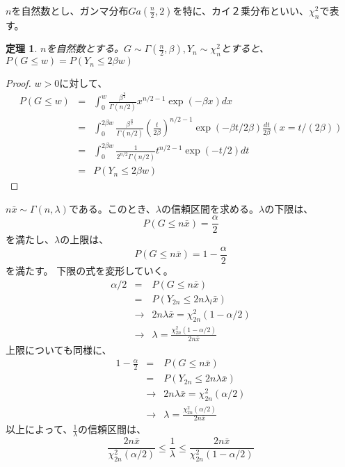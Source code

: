 \documentclass[a4paper,11pt,dvipdfmx]{jsarticle}
\newtheorem{theo}{定理}[section]
\begin{document}


$n$を自然数とし、ガンマ分布$Ga(\frac{n}{2},2)$を特に、カイ２乗分布といい、$\chi ^2_n$で表す。



\begin{theo}
$n$を自然数とする。$G\sim\Gamma(\frac{n}{2},\beta),Y_n\sim \chi^2_n$とすると、$P(G\leq w) = P(Y_n \leq 2\beta w)$
\end{theo}
\begin{proof}
$w >0$に対して、
\begin{eqnarray*}
    P(G \leq w) &=& \int_0^w \frac{\beta^\frac{n}{2}}{\Gamma(n/2)}x^{n/2-1}\exp{(-\beta x)}dx \\
    &=&\int_0^{2\beta w} \frac{\beta^{\frac{n}{2}}}{\Gamma(n/2)}\left( \frac{t}{2\beta} \right)^{n/2-1}\exp{(-\beta t/2\beta)}\frac{dt}{2\beta} (x=t/(2\beta)) \\
    &=& \int_0^{2\beta w} \frac{1}{2^{n/2}\Gamma(n/2)}t^{n/2-1}\exp{(-t/2)}dt\\
    &=&P(Y_n \leq 2\beta w)
\end{eqnarray*}
\end{proof}



$n\bar{x}\sim \Gamma(n,\lambda)$である。このとき、$\lambda$の信頼区間を求める。$\lambda$の下限は、
\begin{equation}
    P(G\leq n\bar{x}) = \frac{\alpha}{2}
\end{equation}
を満たし、$\lambda$の上限は、
\begin{equation}
P(G\leq n\bar{x}) = 1-\frac{\alpha}{2}
\end{equation}
を満たす。
下限の式を変形していく。
\begin{eqnarray*}
    \alpha/2 &=& P(G\leq n\bar{x})  \\
    &=& P(Y_{2n}\leq 2n \lambda_l \bar{x})\\
    &\rightarrow& 2n\lambda \bar{x} = \chi^2_{2n}(1-\alpha/2)\\
    &\rightarrow& \lambda = \frac{\chi^2_{2n}(1-\alpha/2)}{2n\bar{x}}
\end{eqnarray*}
上限についても同様に、
\begin{eqnarray*}
    1-\frac{\alpha}{2} &= & P(G\leq n\bar{x}) \\
    &=& P(Y_{2n}\leq 2n\lambda \bar{x})  \\
    &\rightarrow& 2n\lambda \bar{x} = \chi^2_{2n}(\alpha/2)\\
    &\rightarrow&  \lambda = \frac{\chi^2_{2n}(\alpha/2)}{2n\bar{x}}
\end{eqnarray*}
以上によって、$\frac{1}{\lambda}$の信頼区間は、
\begin{equation}
    \frac{2n\bar{x}}{\chi^2_{2n}(\alpha/2)} \leq \frac{1}{\lambda} \leq \frac{2n\bar{x}}{\chi^2_{2n}(1-\alpha/2)}
\end{equation}
\end{document}
